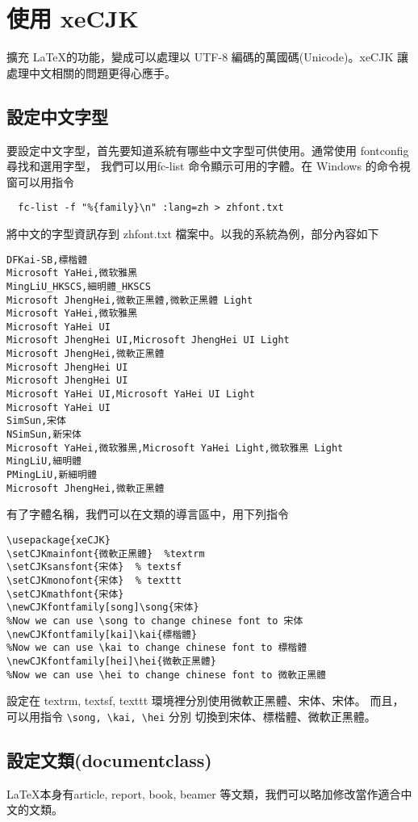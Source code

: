 \documentclass{creport}
\begin{document}
\chapter{使用 xeCJK}
\XeLaTeX 擴充 \LaTeX 的功能，變成可以處理以 UTF-8 編碼的萬國碼(Unicode)。xeCJK 讓 \XeLaTeX 處理中文相關的問題更得心應手。
\section{設定中文字型}
要設定中文字型，首先要知道系統有哪些中文字型可供使用。\XeTeX 通常使用 fontconfig 尋找和選用字型，
我們可以用fc-list 命令顯示可用的字體。在 Windows 的命令視窗可以用指令
\begin{verbatim}
  fc-list -f "%{family}\n" :lang=zh > zhfont.txt
\end{verbatim}
將中文的字型資訊存到 zhfont.txt 檔案中。以我的系統為例，部分內容如下
\begin{verbatim}
DFKai-SB,標楷體
Microsoft YaHei,微软雅黑
MingLiU_HKSCS,細明體_HKSCS
Microsoft JhengHei,微軟正黑體,微軟正黑體 Light
Microsoft YaHei,微软雅黑
Microsoft YaHei UI
Microsoft JhengHei UI,Microsoft JhengHei UI Light
Microsoft JhengHei,微軟正黑體
Microsoft JhengHei UI
Microsoft JhengHei UI
Microsoft YaHei UI,Microsoft YaHei UI Light
Microsoft YaHei UI
SimSun,宋体
NSimSun,新宋体
Microsoft YaHei,微软雅黑,Microsoft YaHei Light,微软雅黑 Light
MingLiU,細明體
PMingLiU,新細明體
Microsoft JhengHei,微軟正黑體
\end{verbatim}
有了字體名稱，我們可以在文類的導言區中，用下列指令
\begin{verbatim}
\usepackage{xeCJK}
\setCJKmainfont{微軟正黑體}  %textrm
\setCJKsansfont{宋体}	 % textsf
\setCJKmonofont{宋体}  % texttt
\setCJKmathfont{宋体}
\newCJKfontfamily[song]\song{宋体}
%Now we can use \song to change chinese font to 宋体
\newCJKfontfamily[kai]\kai{標楷體} 
%Now we can use \kai to change chinese font to 標楷體
\newCJKfontfamily[hei]\hei{微軟正黑體} 
%Now we can use \hei to change chinese font to 微軟正黑體
\end{verbatim}
設定在 textrm, textsf, texttt 環境裡分別使用微軟正黑體、宋体、宋体。
而且，
可以用指令 \verb+\song, \kai, \hei+
分別 切換到宋体、標楷體、微軟正黑體。

\section{設定文類(documentclass)}

\LaTeX 本身有article, report, book, beamer 等文類，我們可以略加修改當作適合中文的文類。
\end{document}
